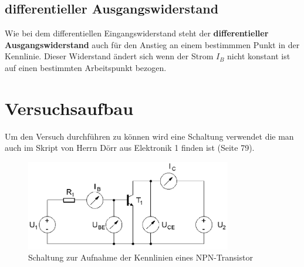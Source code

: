         \subsection{differentieller Ausgangswiderstand}
            Wie bei dem differentiellen Eingangswiderstand steht der \textbf{differentieller Ausgangswiderstand} auch für den Anstieg an einem bestimmmen Punkt in der Kennlinie.
            Dieser Widerstand ändert sich wenn der Strom \(I_B\) nicht konstant ist auf einen bestimmten Arbeitspunkt bezogen.

    \section{Versuchsaufbau}
        Um den Versuch durchführen zu können wird eine Schaltung verwendet die man auch im Skript von Herrn Dörr aus Elektronik 1 finden ist (Seite 79). 
         \begin{figure}[h!]
            \centering
            \includegraphics[width=9cm]{Bilder/npn_transistorschaltung.PNG}
            \caption{Schaltung zur Aufnahme der Kennlinien eines NPN-Transistor}
            \label{fig:npn_transistor}
         \end{figure}